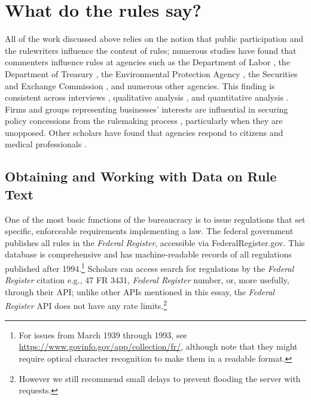 \documentclass[
      12pt,
        ]{article}
\begin{document}
\hypertarget{what-do-the-rules-say}{%
\section{What do the rules say?}\label{what-do-the-rules-say}}

All of the work discussed above relies on the notion that public
participation and the rulewriters influence the content of rules;
numerous studies have found that commenters influence rules \citep[see,
e.g.,][\citet{YackeeJOP2006},\citet{NaughtonJPAM2009},\citet{HaederAPSR2015},\citet{HaederJPART2018}]{CuellarALR2005}
at agencies such as the Department of Labor \citep{YackeeJOP2006}, the
Department of Treasury \citep{CuellarALR2005}, the Environmental
Protection Agency \citep{WagnerALR2011}, the Securities and Exchange
Commission \citep{Rashin2019}, and numerous other agencies. This finding
is consistent across interviews \citep[e.g.,][]{FurlongJPART1998},
qualitative analysis \citep[e.g.,][]{CuellarALR2005}, and quantitative
analysis \citep[e.g.,][]{YackeeJOP2006}. Firms and groups representing
businesses' interests are influential in securing policy concessions
from the rulemaking process
\citep[\citet{YackeeJOP2006},\citet{Carpenter2013}]{YackeeJPART2006},
particularly when they are unopposed. Other scholars have found that
agencies respond to citizens \citep{BallaPI2019} and medical
professionals \citep[\citet{GordonRashinJOP}]{BallaAPSR1998}.

\hypertarget{obtaining-and-working-with-data-on-rule-text}{%
\subsection{Obtaining and Working with Data on Rule
Text}\label{obtaining-and-working-with-data-on-rule-text}}

One of the most basic functions of the bureaucracy is to issue
regulations that set specific, enforceable requirements implementing a
law. The federal government publishes all rules in the \emph{Federal
Register}, accessible via FederalRegister.gov. This database is
comprehensive and has machine-readable records of all regulations
published after 1994.\footnote{For issues from March 1939 through 1993,
  see \url{https://www.govinfo.gov/app/collection/fr/}, although note
  that they might require optical character recognition to make them in
  a readable format.} Scholars can access search for regulations by the
\emph{Federal Register} citation e.g., 47 FR 3431, \emph{Federal
Register} number, or, more usefully, through their API; unlike other
APIs mentioned in this essay, the \emph{Federal Register} API does not
have any rate limits.\footnote{However we still recommend small delays
  to prevent flooding the server with requests.}
\end{document}
